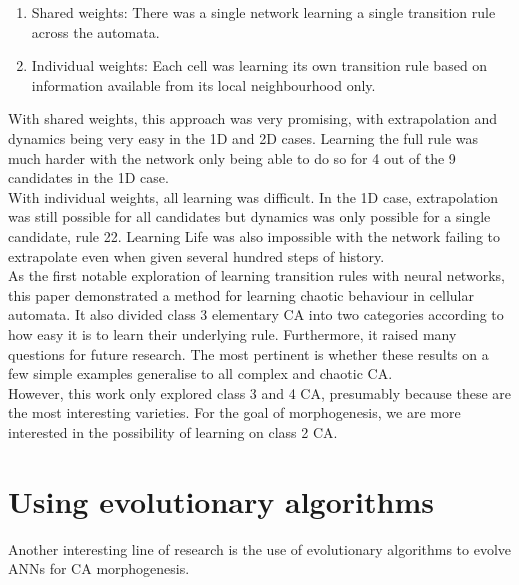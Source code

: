 \begin{enumerate}
  \item Shared weights: There was a single network learning a single transition rule across the automata.
  \item Individual weights: Each cell was learning its own transition rule based on information available from its local neighbourhood only.
\end{enumerate}

With shared weights, this approach was very promising, with extrapolation and dynamics being very easy in the 1D and 2D cases.
Learning the full rule was much harder with the network only being able to do so for 4 out of the 9 candidates in the 1D case. \\ 

With individual weights, all learning was difficult. 
In the 1D case, extrapolation was still possible for all candidates but dynamics was only possible for a single candidate, rule 22. 
Learning Life was also impossible with the network failing to extrapolate even when given several hundred steps of history.\\ 

As the first notable exploration of learning transition rules with neural networks, this paper demonstrated a method for learning chaotic behaviour in cellular automata.
It also divided class 3 elementary CA into two categories according to how easy it is to learn their underlying rule.
Furthermore, it raised many questions for future research.
The most pertinent is whether these results on a few simple examples generalise to all complex and chaotic CA.\\

However, this work only explored class 3 and 4 CA, presumably because these are the most interesting varieties.
For the goal of morphogenesis, we are more interested in the possibility of learning on class 2 CA.

\section{Using evolutionary algorithms}
Another interesting line of research is the use of evolutionary algorithms to evolve ANNs for CA morphogenesis.\\

